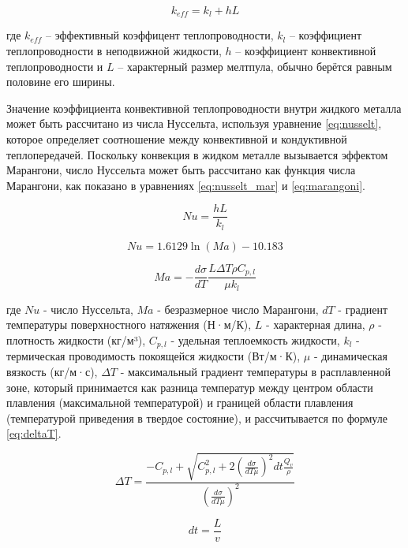 \begin{equation}
    k_{eff} = k_l + hL
\end{equation}

\noindent
где $k_{eff}$ -- эффективный коэффицент теплопроводности, $k_l$ -- коэффициент теплопроводности в неподвижной жидкости, $h$ -- коэффициент конвективной теплопроводности и $L$ -- характерный размер мелтпула, обычно берётся равным половине его ширины.  

Значение коэффициента конвективной теплопроводности внутри жидкого металла может быть рассчитано из числа Нуссельта, используя уравнение \ref{eq:nusselt}, которое определяет соотношение между конвективной и кондуктивной теплопередачей. Поскольку конвекция в жидком металле вызывается эффектом Марангони, число Нуссельта может быть рассчитано как функция числа Марангони, как показано в уравнениях \ref{eq:nusselt_mar} и \ref{eq:marangoni}.

\begin{equation}
    \label{eq:nusselt}
    Nu = \frac{hL}{k_l}
\end{equation}

\begin{equation}
    \label{eq:nusselt_mar}
    Nu = 1.6129\ln (Ma) - 10.183
\end{equation}

\begin{equation}
    \label{eq:marangoni}
    Ma = - \frac{d\sigma}{dT} \frac{L\Delta T \rho C_{p,l}}{\mu k_l}
\end{equation}

\noindent
где $Nu$ - число Нуссельта, $Ma$ - безразмерное число Марангони, $dT$ - градиент температуры поверхностного натяжения (Н·м/К), $L$ - характерная длина, $\rho$ - плотность жидкости (кг/м³), $C_{p,l}$ - удельная теплоемкость жидкости, $k_l$ - термическая проводимость покоящейся жидкости (Вт/м·К), $\mu$ - динамическая вязкость (кг/м·с), $\Delta T$ - максимальный градиент температуры в расплавленной зоне, который принимается как разница температур между центром области плавления (максимальной температурой) и границей области плавления (температурой приведения в твердое состояние), и рассчитывается по формуле \ref{eq:deltaT}.

\begin{equation}
    \label{eq:deltaT}
    \Delta T = \frac{
        -C_{p,l} + \sqrt{
            C^2_{p,l} + 2\left(\frac{d\sigma}{dT\mu}\right)^2 dt\frac{Q_v}\rho
            }
        }{
            \left(\frac{d\sigma}{dT\mu}\right)^2
        }
\end{equation}

\begin{equation}
    dt = \frac{L}{v}
\end{equation}

\clearpage